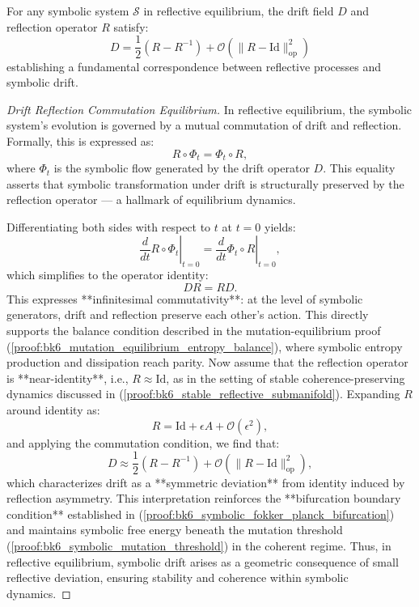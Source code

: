 \begin{proposition}
\label{prop:bk6_drift_reflection_correspondence}
For any symbolic system $\mathcal{S}$ in reflective equilibrium, the drift field $D$ and reflection operator $R$ satisfy:
\begin{equation}
D = \frac{1}{2}(R - R^{-1}) + \mathcal{O}(\|R - \text{Id}\|_{\text{op}}^2)
\end{equation}
establishing a fundamental correspondence between reflective processes and symbolic drift.
\begin{proof}[Drift Reflection Commutation Equilibrium]
\label{proof:bk6_drift_reflection_commutation_equilibrium}
In reflective equilibrium, the symbolic system’s evolution is governed by a mutual commutation of drift and reflection. Formally, this is expressed as:
\[
R \circ \Phi_t = \Phi_t \circ R,
\]
where \( \Phi_t \) is the symbolic flow generated by the drift operator \( D \). This equality asserts that symbolic transformation under drift is structurally preserved by the reflection operator — a hallmark of equilibrium dynamics.

Differentiating both sides with respect to \( t \) at \( t = 0 \) yields:
\[
\left.\frac{d}{dt} R \circ \Phi_t \right|_{t=0} = \left. \frac{d}{dt} \Phi_t \circ R \right|_{t=0},
\]
which simplifies to the operator identity:
\[
DR = RD.
\]
This expresses **infinitesimal commutativity**: at the level of symbolic generators, drift and reflection preserve each other’s action. This directly supports the balance condition described in the mutation-equilibrium proof (\ref{proof:bk6_mutation_equilibrium_entropy_balance}), where symbolic entropy production and dissipation reach parity.
Now assume that the reflection operator is **near-identity**, i.e., \( R \approx \text{Id} \), as in the setting of stable coherence-preserving dynamics discussed in (\ref{proof:bk6_stable_reflective_submanifold}). Expanding \( R \) around identity as:
\[
R = \text{Id} + \epsilon A + \mathcal{O}(\epsilon^2),
\]
and applying the commutation condition, we find that:
\[
D \approx \frac{1}{2}(R - R^{-1}) + \mathcal{O}(\|R - \text{Id}\|_{\text{op}}^2),
\]
which characterizes drift as a **symmetric deviation** from identity induced by reflection asymmetry. This interpretation reinforces the **bifurcation boundary condition** established in (\ref{proof:bk6_symbolic_fokker_planck_bifurcation}) and maintains symbolic free energy beneath the mutation threshold (\ref{proof:bk6_symbolic_mutation_threshold}) in the coherent regime.
Thus, in reflective equilibrium, symbolic drift arises as a geometric consequence of small reflective deviation, ensuring stability and coherence within symbolic dynamics.
\end{proof}
\end{proposition}

